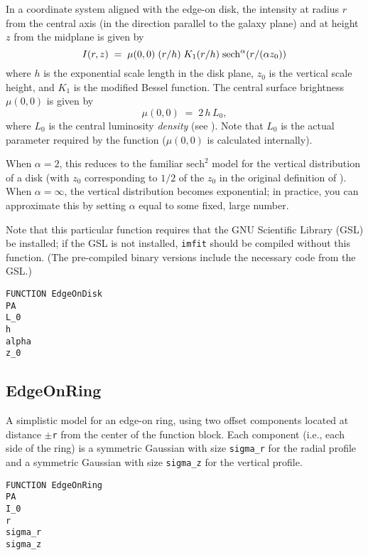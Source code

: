 \documentclass[10pt]{article}
\newcommand{\imfit}{\texttt{imfit}}
\begin{document}
In a coordinate system aligned with the edge-on disk, the intensity at radius $r$ from 
the central axis (in the direction parallel to the galaxy plane) and
at height $z$ from the midplane is given by
\begin{equation}
I(r,z) \; = \; \mu(0,0) \; (r/h) \; K_{1}(r/h) \; {\rm sech}^{\alpha} (r/(\alpha z_{0}))
\end{equation}
where $h$ is the exponential scale length in the disk plane, $z_{0}$ is the vertical
scale height, and $K_{1}$ is the modified Bessel function. The central surface brightness 
$\mu(0,0)$ is given by
\begin{equation}
\mu(0,0) \; = \;  2 \, h \, L_{0},
\end{equation}
where $L_{0}$ is the central luminosity \textit{density} (see \citealt{vdk81}). Note that 
$L_{0}$ is the actual parameter required by the function ($\mu(0,0)$ is calculated 
internally).

When $\alpha = 2$, this reduces to the familiar $\mathrm{sech}^2$ model for the
vertical distribution of a disk (with $z_{0}$ corresponding to $1/2$ of the
$z_0$ in the original definition of \citet{vdk81}). When $\alpha = \infty$, the
vertical distribution becomes exponential; in practice, you can approximate this
by setting $\alpha$ equal to some fixed, large number.

Note that this particular function requires that the GNU Scientific Library
(GSL) be installed; if the GSL is not installed, \imfit{} should be compiled
without this function. (The pre-compiled binary versions include the necessary
code from the GSL.)

\begin{verbatim}
FUNCTION EdgeOnDisk
PA
L_0
h
alpha
z_0
\end{verbatim}


\subsection{EdgeOnRing}

A simplistic model for an edge-on ring, using two offset components located
at distance $\pm$\texttt{r} from the center of the function block. Each component
(i.e., each side of the ring) is a symmetric Gaussian with size
\texttt{sigma\_r} for the radial profile and a symmetric Gaussian with
size \texttt{sigma\_z} for the vertical profile.

\begin{verbatim}
FUNCTION EdgeOnRing
PA
I_0
r
sigma_r
sigma_z
\end{verbatim}
\end{document}

